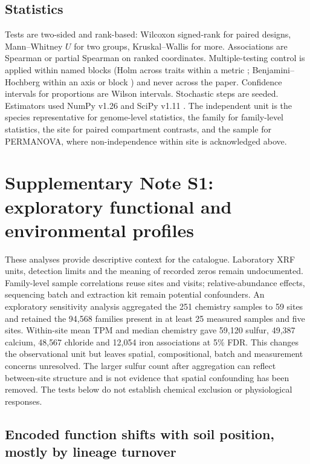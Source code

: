 \documentclass[11pt]{article}
\begin{document}
\subsection*{Statistics}
Tests are two-sided and rank-based: Wilcoxon signed-rank for paired designs, Mann--Whitney $U$ for
two groups, Kruskal--Wallis for more. Associations are Spearman or partial Spearman on ranked
coordinates. Multiple-testing control is applied within named blocks (Holm across traits within a
metric \citep{holm1979multiple}; Benjamini--Hochberg within an axis or block \citep{benjamini1995fdr})
and never across the paper. Confidence intervals for proportions are Wilson intervals. Stochastic
steps are seeded. Estimators used NumPy v1.26 \citep{harris2020numpy} and SciPy v1.11
\citep{virtanen2020scipy}. The independent unit is the species representative for genome-level
statistics, the family for family-level statistics, the site for paired compartment contrasts, and
the sample for PERMANOVA, where non-independence within site is acknowledged above.

\section*{Supplementary Note S1: exploratory functional and environmental profiles}
These analyses provide descriptive context for the catalogue. Laboratory XRF units, detection
limits and the meaning of recorded zeros remain undocumented. Family-level sample correlations
reuse sites and visits; relative-abundance effects, sequencing batch and extraction kit remain
potential confounders. An exploratory sensitivity analysis aggregated the 251 chemistry samples to 59 sites and retained the 94{,}568 families present in at least 25 measured samples and five sites. Within-site mean TPM and median chemistry gave 59{,}120 sulfur, 49{,}387 calcium, 48{,}567 chloride and 12{,}054 iron associations at 5\% FDR. This changes the observational unit but leaves spatial, compositional, batch and measurement concerns unresolved. The larger sulfur count after aggregation can reflect between-site structure and is not evidence that spatial confounding has been removed. The tests below do not establish chemical exclusion or physiological responses.

\subsection*{Encoded function shifts with soil position, mostly by lineage turnover}
\end{document}
